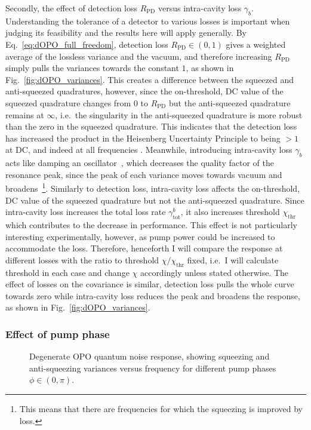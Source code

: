 Secondly, the effect of detection loss $R_\text{PD}$ versus intra-cavity loss $\gamma_b$. Understanding the tolerance of a detector to various losses is important when judging its feasibility and the results here will apply generally. By Eq.~\ref{eq:dOPO_full_freedom}, detection loss $R_\text{PD}\in(0,1)$ gives a weighted average of the lossless variance and the vacuum, and therefore increasing $R_\text{PD}$ simply pulls the variances towards the constant $1$, as shown in Fig.~\ref{fig:dOPO_variances}. This creates a difference between the squeezed and anti-squeezed quadratures, however, since the on-threshold, DC value of the squeezed quadrature changes from $0$ to $R_\text{PD}$ but the anti-squeezed quadrature remains at $\infty$, i.e.\ the singularity in the anti-squeezed quadrature is more robust than the zero in the squeezed quadrature. This indicates that the detection loss has increased the product in the Heisenberg Uncertainty Principle to being $>1$ at DC, and indeed at all frequencies . Meanwhile, introducing intra-cavity loss $\gamma_b$ acts like damping an oscillator~\cite{}, which decreases the quality factor of the resonance peak, since the peak of each variance moves towards vacuum and broadens~\footnote{This means that there are frequencies for which the squeezing is improved by loss.}. Similarly to detection loss, intra-cavity loss affects the on-threshold, DC value of the squeezed quadrature but not the anti-squeezed quadrature. Since intra-cavity loss increases the total loss rate $\gamma^b_\text{tot}$, it also increases threshold $\chi_\text{thr}$ which contributes to the decrease in performance. This effect is not particularly interesting experimentally, however, as pump power could be increased to accommodate the loss. Therefore, henceforth I will compare the response at different losses with the ratio to threshold $\chi/\chi_\text{thr}$ fixed, i.e.\ I will calculate threshold in each case and change $\chi$ accordingly unless stated otherwise. 
The effect of losses on the covariance is similar, detection loss pulls the whole curve towards zero while intra-cavity loss reduces the peak and broadens the response, as shown in Fig.~\ref{fig:dOPO_variances}.

\subsubsection{Effect of pump phase}

\begin{figure}
	\centering
	\caption{Degenerate OPO quantum noise response, showing squeezing and anti-squeezing variances versus frequency for different pump phases $\phi \in (0,\pi)$.}
	\label{fig:dOPO_variances_pump_phase}
\end{figure}

